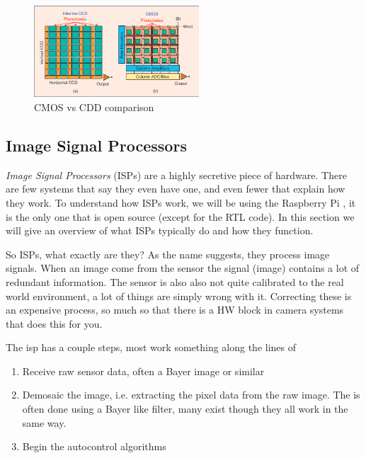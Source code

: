 \begin{figure}
    \begin{center}
        \includegraphics[width=0.55\textwidth]{figures/cmos_vs_cdd}
    \end{center}
    \caption{CMOS vs CDD comparison\cite{ieeeCMOS}}\label{fig:cmosvsccd}
\end{figure}


\subsection{Image Signal Processors}
\textit{Image Signal Processors} (ISPs) are a highly secretive piece of hardware. There
are few systems that say they even have one, and even fewer that explain how
they work. To understand how ISPs work, we will be using the Raspberry Pi
\cite{raspberrypiTuningGuide}, it is the only one that is open source (except
for the RTL code). In this section we will give an overview of what ISPs
typically do and how they function.

So ISPs, what exactly are they? As the name suggests, they process image signals.
When an image come from the sensor the signal (image) contains a lot of
redundant information. The sensor is also also not quite calibrated to the real
world environment, a lot of things are simply wrong with it. Correcting these
is an expensive process, so much so that there is a HW block in camera systems
that does this for you.

The isp has a couple steps, most work something along the lines of

\begin{enumerate}
    \item Receive raw sensor data, often a Bayer image or similar
    \item Demosaic the image, i.e. extracting the pixel data from the raw image.
          The is often done using a Bayer like filter, many exist though they
          all work in the same way.
    \item Begin the autocontrol algorithms


\end{enumerate}


